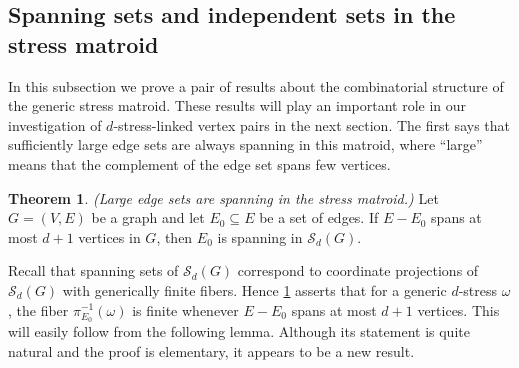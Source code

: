 \documentclass[11pt,a4paper,dvipsnames]{scrartcl}
\theoremstyle{definition}
\newtheorem{theorem}{Theorem}[section]
\newcommand{\stressmatroid}[2]{\mathcal{S}_{#1}(#2)}
\begin{document}
\subsection{Spanning sets and independent sets in the stress matroid}\label{subsection:spanningindependent}

In this subsection we prove a pair of results about the combinatorial structure of the generic stress matroid. These results will play an important role in our investigation of $d$-stress-linked vertex pairs in the next section. The first says that sufficiently large edge sets are always spanning in this matroid, where ``large'' means that the complement of the edge set spans few vertices.  %
\begin{theorem}\label{corollary:stressmatroidspanning} \emph{(Large edge sets are spanning in the stress matroid.)}\newline
    Let $G = (V,E)$ be a graph 
    and let $E_0 \subseteq E$ be a set of edges. If $E - E_0$ spans at most $d+1$ vertices in $G$, then $E_0$ is spanning in $\stressmatroid{d}{G}$.
\end{theorem}

Recall that spanning sets of $\stressmatroid{d}{G}$ correspond to coordinate projections of $\mathcal{S}_d(G)$ with generically finite fibers. Hence
\cref{corollary:stressmatroidspanning} asserts that for a generic $d$-stress $\omega$, the fiber $\pi^{-1}_{E_0}(\omega)$ is finite whenever $E - E_0$ spans at most $d+1$ vertices. This will easily follow from the following lemma. Although its statement is quite natural and the proof is elementary, it appears to be a new result.
\end{document}
